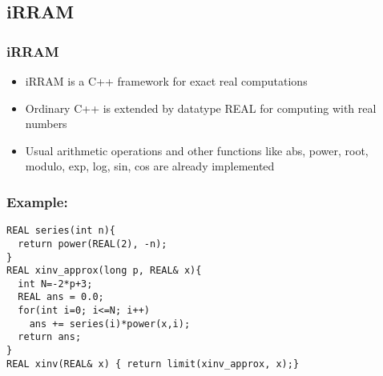 \subsection{iRRAM}
\begin{frame}[<+->]
\frametitle{iRRAM}
\begin{itemize}[<+->]
\item iRRAM is a C++ framework for exact real computations
\item Ordinary C++ is extended by datatype REAL for computing with real numbers
\item Usual arithmetic operations and other functions like abs, power, root, modulo, exp, log, sin, cos are already implemented
\end{itemize}
\end{frame}
\begin{frame}[<+->][fragile]
\frametitle{Example: \irram}
\begin{example}
\begin{lstlisting}
REAL series(int n){
  return power(REAL(2), -n);
}
REAL xinv_approx(long p, REAL& x){
  int N=-2*p+3;
  REAL ans = 0.0;
  for(int i=0; i<=N; i++)
    ans += series(i)*power(x,i);
  return ans;
}
REAL xinv(REAL& x) { return limit(xinv_approx, x);}
\end{lstlisting}
\end{example}
\end{frame}
